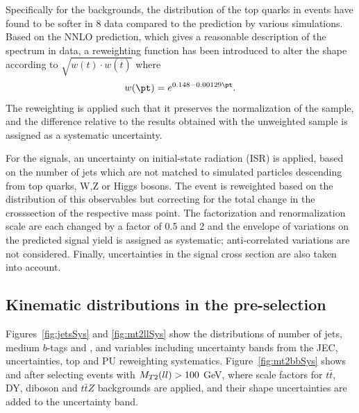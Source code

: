 Specifically for the backgrounds, the \pt distribution of the top quarks in \ttbar events have found to be softer in 8 \TeV data compared to the prediction by various simulations. 
Based on the NNLO prediction, which gives a reasonable description of the \pt spectrum in data,
a reweighting function has been introduced to alter the shape according to $\sqrt{w(t)\cdot w(\overline{t})}$ where
\begin{equation}
w(\pt) = e^{0.148-0.00129\pt}.
\end{equation}
The reweighting is applied such that it preserves the normalization of the sample, and the difference relative to the results obtained with the unweighted sample is assigned as a systematic uncertainty.

For the signals, an uncertainty on initial-state radiation (ISR) is applied, based on the number of jets which are not matched to simulated particles descending from top quarks, W,Z or Higgs bosons. 
The event is reweighted based on the distribution of this observables but correcting for the total change in the crosssection of the respective mass point.
The factorization and renormalization scale are each changed by a factor of 0.5 and 2 and the envelope of variations on the predicted signal yield is assigned as systematic; anti-correlated variations
are not considered.
Finally, uncertainties in the signal cross section are also taken into account.

\subsection{Kinematic distributions in the pre-selection}
\label{sec:preselectionplots}
Figures~\ref{fig:jetsSys} and \ref{fig:mt2llSys} show the distributions of number of jets, medium $b$-tags and \mtll, \mtbb and \mtlblb variables including uncertainty bands from the JEC, \ETmiss uncertainties, top \pt and PU reweighting systematics.
Figure~\ref{fig:mt2bbSys} shows \mtbb and \mtlblb after selecting events with $M_{T2}(ll) > 100$ GeV, where scale factors for $t\bar{t}$, DY, diboson and $t\bar{t}Z$ backgrounds are applied, and their shape uncertainties
are added to the uncertainty band.

